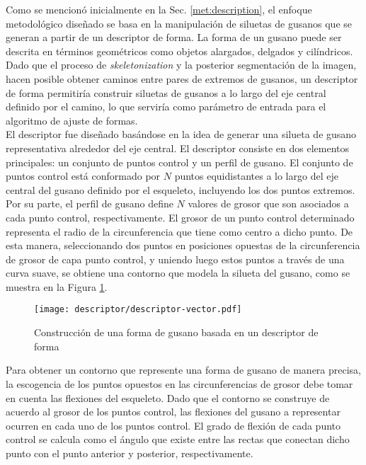 Como se mencion\'o inicialmente en la Sec. \ref{met:description}, 
el enfoque metodol\'ogico dise\~nado se basa en la manipulaci\'on de 
siluetas de gusanos que se generan a partir de un descriptor de forma.
La forma de un gusano puede ser descrita en t\'erminos geom\'etricos
como objetos alargados, delgados y cil\'indricos. Dado que el proceso
de \emph{skeletonization} y la posterior segmentaci\'on de la imagen, hacen
posible obtener caminos entre pares de extremos de gusanos, un descriptor
de forma permitir\'ia construir siluetas de gusanos a lo largo del
eje central definido por el camino, lo que servir\'ia como par\'ametro
de entrada para el algoritmo de ajuste de formas.\\


El descriptor fue dise\~nado bas\'andose en la idea de generar una silueta
de gusano representativa alrededor del eje central. El descriptor consiste en
dos elementos principales: un conjunto de puntos control y un perfil de gusano.
El conjunto de puntos control est\'a conformado por $N$ puntos equidistantes a lo
largo del eje central del gusano definido por el esqueleto, incluyendo los
dos puntos extremos. Por su parte, el perfil de gusano define $N$ valores de 
grosor que son asociados a cada punto control, respectivamente. El grosor de
un punto control determinado representa el radio de la circunferencia que tiene
como centro a dicho punto. De esta manera, seleccionando dos puntos en posiciones
opuestas de la circunferencia de grosor de capa punto control, y uniendo luego estos
puntos a trav\'es de una curva suave, se obtiene una contorno
que modela la silueta del gusano, como se muestra en la Figura 
\ref{fig:descriptor}. 

\begin{figure}[h]
 \centering
   \texttt{[image: descriptor/descriptor-vector.pdf]}
 \caption{Construcci\'on de una forma de gusano basada en un descriptor de forma}
 \label{fig:descriptor}
\end{figure}

Para obtener un contorno que represente una forma de gusano de manera precisa,
la escogencia de los puntos opuestos en las circunferencias de grosor
debe tomar en cuenta las flexiones del esqueleto. Dado que el contorno se
construye de acuerdo al grosor de los puntos control, las flexiones del gusano
a representar ocurren en cada uno de los puntos control. El grado de flexi\'on
de cada punto control se calcula como el \'angulo que existe entre las rectas
que conectan dicho punto con el punto anterior y posterior, respectivamente.\\

